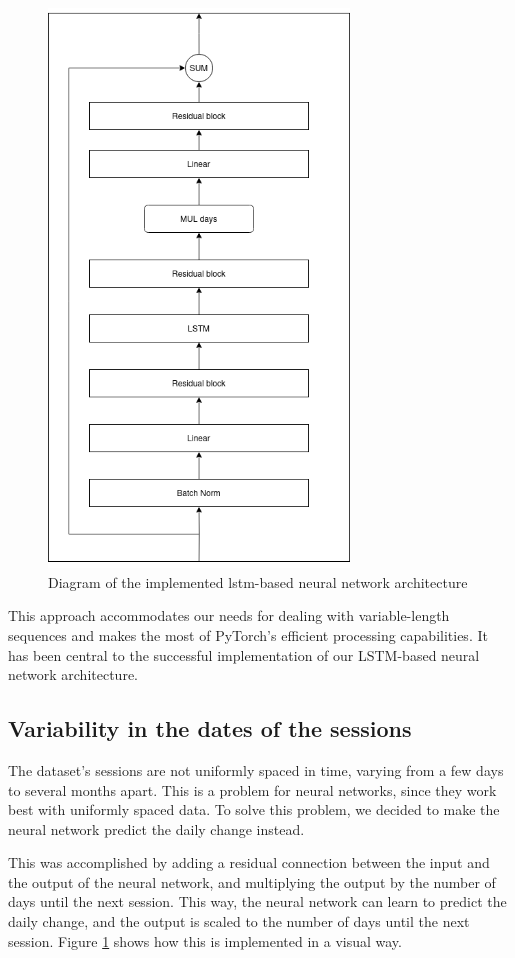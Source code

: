 \begin{figure}
    \centering
    \includegraphics[width=8cm]{files/nn_diagram}
    \caption{Diagram of the implemented \gls{lstm}-based neural network architecture}
    \label{fig:nn_diagram}
\end{figure}

This approach accommodates our needs for dealing with variable-length sequences
and makes the most of PyTorch's efficient processing capabilities. It has been
central to the successful implementation of our LSTM-based neural network
architecture.

\subsection{Variability in the dates of the sessions}

The dataset's sessions are not uniformly spaced in time, varying from a few
days to several months apart. This is a problem for neural networks, since they
work best with uniformly spaced data. To solve this problem, we decided to make
the neural network predict the daily change instead.

This was accomplished by adding a residual connection between the input and the
output of the neural network, and multiplying the output by the number of days
until the next session. This way, the neural network can learn to predict the
daily change, and the output is scaled to the number of days until the next
session. Figure \ref{fig:nn_diagram} shows how this is implemented in a visual
way.

